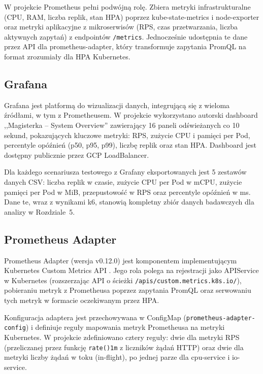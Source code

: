 W projekcie Prometheus pełni podwójną rolę. Zbiera metryki infrastrukturalne (CPU, RAM, liczba replik, stan HPA) poprzez kube-state-metrics i node-exporter oraz metryki aplikacyjne z mikroserwisów (RPS, czas przetwarzania, liczba aktywnych zapytań) z endpointów \texttt{/metrics}. Jednocześnie udostępnia te dane przez API dla prometheus-adapter, który transformuje zapytania PromQL na format zrozumiały dla HPA Kubernetes.

\subsection{Grafana}

Grafana jest platformą do wizualizacji danych, integrującą się z wieloma źródłami, w tym z Prometheusem. W projekcie wykorzystano autorski dashboard ,,Magisterka -- System Overview'' zawierający 16 paneli odświeżanych co 10 sekund, pokazujących kluczowe metryki: RPS, zużycie CPU i pamięci per Pod, percentyle opóźnień (p50, p95, p99), liczbę replik oraz stan HPA. Dashboard jest dostępny publicznie przez GCP LoadBalancer.

Dla każdego scenariusza testowego z Grafany eksportowanych jest 5 zestawów danych CSV: liczba replik w czasie, zużycie CPU per Pod w mCPU, zużycie pamięci per Pod w MiB, przepustowość w RPS oraz percentyle opóźnień w ms. Dane te, wraz z wynikami k6, stanowią kompletny zbiór danych badawczych dla analizy w Rozdziale~5.

\subsection{Prometheus Adapter}

Prometheus Adapter (wersja v0.12.0) jest komponentem implementującym Kubernetes Custom Metrics API \cite{prometheus-adapter}. Jego rola polega na rejestracji jako APIService w Kubernetes (rozszerzając API o ścieżki \texttt{/apis/custom.metrics.k8s.io/}), pobieraniu metryk z Prometheusa poprzez zapytania PromQL oraz serwowaniu tych metryk w formacie oczekiwanym przez HPA.

Konfiguracja adaptera jest przechowywana w ConfigMap (\texttt{prometheus-adapter-config}) i definiuje reguły mapowania metryk Prometheusa na metryki Kubernetes. W projekcie zdefiniowano cztery reguły: dwie dla metryki RPS (przeliczanej przez funkcję \texttt{rate()\lbrack{}1m\rbrack{}} z liczników żądań HTTP) oraz dwie dla metryki liczby żądań w toku (in-flight), po jednej parze dla cpu-service i io-service.


